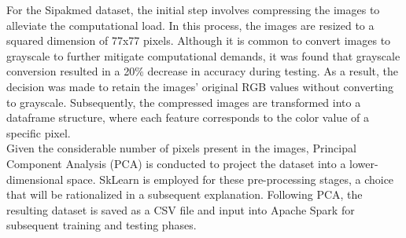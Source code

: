 \documentclass[12pt]{report}
\begin{document}
For the Sipakmed dataset, the initial step involves compressing the images to alleviate the computational load. In this process, the images are resized to a squared dimension of 77x77 pixels. Although it is common to convert images to grayscale to further mitigate computational demands, it was found that grayscale conversion resulted in a 20\% decrease in accuracy during testing. As a result, the decision was made to retain the images' original RGB values without converting to grayscale. Subsequently, the compressed images are transformed into a dataframe structure, where each feature corresponds to the color value of a specific pixel.\\
\indent Given the considerable number of pixels present in the images, Principal Component Analysis (PCA) is conducted to project the dataset into a lower-dimensional space. SkLearn is employed for these pre-processing stages, a choice that will be rationalized in a subsequent explanation. Following PCA, the resulting dataset is saved as a CSV file and input into Apache Spark for subsequent training and testing phases.
\end{document}
